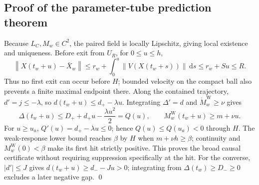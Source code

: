 \documentclass{article}
\theoremstyle{definition}
\theoremstyle{remark}
\newcommand{\norm}[1]{\left\lVert #1\right\rVert}
\newcommand{\Wcond}{\mathrm{W}}
\newcommand{\dd}{\,\mathrm{d}}
\begin{document}
\subsection{Proof of the parameter-tube prediction theorem}
\label{app:proof-thm-parameter-tube}
Because $L_C,M_w\in C^2$, the paired field is locally Lipschitz, giving local existence and uniqueness. Before exit from $U_R$, for $0\le u\le h$,
\begin{equation}
 \norm{X(t_w+u)-\bar X_w}\le r_w+
 \int_0^u\norm{V(X(t_w+s))}\dd s\le r_w+Su\le R.
 \label{eq:app-parameter-tube-containment}
\end{equation}
Thus no first exit can occur before $H$; bounded velocity on the compact ball also prevents a finite maximal endpoint there. Along the contained trajectory, $d'=j\le-\lambda$, so $d(t_w+u)\le d_+-\lambda u$. Integrating $\Delta'=d$ and $\dot M_w^{\Wcond}\ge\nu$ gives
\begin{equation}
 \Delta(t_w+u)\le D_++d_+u-\frac{\lambda u^2}{2}=Q(u),
 \qquad M_w^{\Wcond}(t_w+u)\ge m+\nu u.
  \label{eq:app-parameter-tube-outcome}
\end{equation}
For $u\ge u_a$, $Q'(u)=d_+-\lambda u\le0$; hence $Q(u)\le Q(u_a)<0$ through $H$. The weak-response lower bound reaches $\beta$ by $H$ when $m+\nu h\ge\beta$; continuity and $M_w^{\Wcond}(0)<\beta$ make its first hit strictly positive. This proves the broad causal certificate without requiring suppression specifically at the hit. For the converse, $|d'|\le J$ gives $d(t_w+u)\ge d_--Ju>0$; integrating from $\Delta(t_w)\ge D_-\ge0$ excludes a later negative gap. \qed
\end{document}
